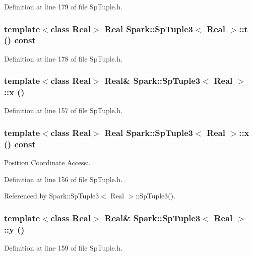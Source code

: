 Definition at line 179 of file Sp\-Tuple.h.
\subsubsection{\setlength{\rightskip}{0pt plus 5cm}template$<$class Real$>$ Real {\bf Spark::Sp\-Tuple3}$<$ Real $>$::t () const\hspace{0.3cm}{\tt  [inline]}}\label{classSpark_1_1SpTuple3_a16}


Definition at line 178 of file Sp\-Tuple.h.
\subsubsection{\setlength{\rightskip}{0pt plus 5cm}template$<$class Real$>$ Real\& {\bf Spark::Sp\-Tuple3}$<$ Real $>$::x ()\hspace{0.3cm}{\tt  [inline]}}\label{classSpark_1_1SpTuple3_a3}


Definition at line 157 of file Sp\-Tuple.h.
\subsubsection{\setlength{\rightskip}{0pt plus 5cm}template$<$class Real$>$ Real {\bf Spark::Sp\-Tuple3}$<$ Real $>$::x () const\hspace{0.3cm}{\tt  [inline]}}\label{classSpark_1_1SpTuple3_a2}


Position Coordinate Access:. 

Definition at line 156 of file Sp\-Tuple.h.

Referenced by Spark::Sp\-Tuple3$<$ Real $>$::Sp\-Tuple3().
\subsubsection{\setlength{\rightskip}{0pt plus 5cm}template$<$class Real$>$ Real\& {\bf Spark::Sp\-Tuple3}$<$ Real $>$::y ()\hspace{0.3cm}{\tt  [inline]}}\label{classSpark_1_1SpTuple3_a5}


Definition at line 159 of file Sp\-Tuple.h.

